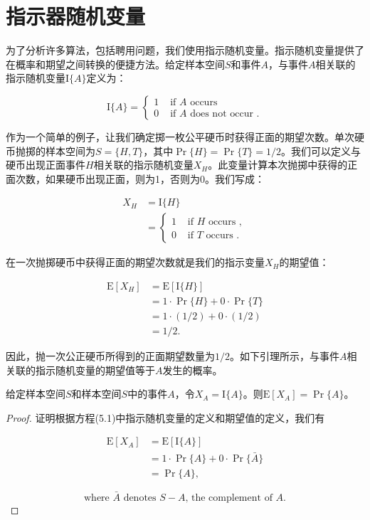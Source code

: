 \documentclass[lang=cn,newtx,10pt,scheme=chinese]{elegantbook}
\begin{document}
\section{指示器随机变量}

为了分析许多算法，包括聘用问题，我们使用指示随机变量。指示随机变量提供了在概率和期望之间转换的便捷方法。给定样本空间$S$和事件$A$，与事件$A$相关联的指示随机变量$\mathrm{I}\{A\}$定义为：

$$
\mathrm{I}\{A\}= \begin{cases}1 & \text { if } A \text { occurs } \\ 0 & \text { if } A \text { does not occur } .\end{cases}
$$

作为一个简单的例子，让我们确定掷一枚公平硬币时获得正面的期望次数。单次硬币抛掷的样本空间为$S=\{H, T\}$，其中$\operatorname{Pr}\{H\}=\operatorname{Pr}\{T\}=1 / 2$。我们可以定义与硬币出现正面事件$H$相关联的指示随机变量$X_H$。此变量计算本次抛掷中获得的正面次数，如果硬币出现正面，则为1，否则为0。我们写成：

$$
\begin{aligned}
X_H & =\mathrm{I}\{H\} \\
& = \begin{cases}1 & \text { if } H \text { occurs }, \\
0 & \text { if } T \text { occurs } .\end{cases}
\end{aligned}
$$

在一次抛掷硬币中获得正面的期望次数就是我们的指示变量$X_H$的期望值：

$$
\begin{aligned}
\mathrm{E}\left[X_H\right] & =\mathrm{E}[\mathrm{I}\{H\}] \\
& =1 \cdot \operatorname{Pr}\{H\}+0 \cdot \operatorname{Pr}\{T\} \\
& =1 \cdot(1 / 2)+0 \cdot(1 / 2) \\
& =1 / 2 .
\end{aligned}
$$

因此，抛一次公正硬币所得到的正面期望数量为$1/2$。如下引理所示，与事件$A$相关联的指示随机变量的期望值等于$A$发生的概率。

\begin{lemma}{}{}
给定样本空间$S$和样本空间$S$中的事件$A$，令$X_A=\mathrm{I}\{A\}$。则$\mathrm{E}\left[X_A\right]=\operatorname{Pr}\{A\}$。
\end{lemma}

\begin{proof}
证明根据方程(5.1)中指示随机变量的定义和期望值的定义，我们有

$$
\begin{aligned}
\mathrm{E}\left[X_A\right] & =\mathrm{E}[\mathrm{I}\{A\}] \\
& =1 \cdot \operatorname{Pr}\{A\}+0 \cdot \operatorname{Pr}\{\bar{A}\} \\
& =\operatorname{Pr}\{A\},
\end{aligned}
$$

$$
\text { where } \bar{A} \text { denotes } S-A \text {, the complement of } A \text {. }
$$
\end{proof}
\end{document}
